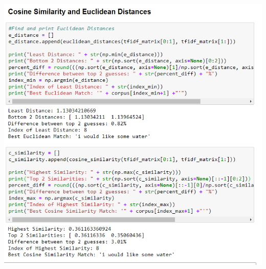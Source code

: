 \documentclass[runningheads]{llncs}
\begin{document}
	\begin{minipage}{\linewidth}
		\begin{center}
			\includegraphics[width=\linewidth]{Terrible_Comparison.png}
			\label{fig:Sentence Comparison 3}
			\vspace*{1cm}
		\end{center}
	\end{minipage}
	\afterpage{\clearpage}
\end{document}
